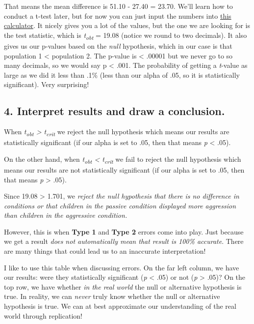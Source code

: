 \documentclass[
]{book}
\begin{document}
That means the mean difference is 51.10 - 27.40 = 23.70. We'll learn how to conduct a t-test later, but for now you can just input the numbers into \href{https://www.usablestats.com/calcs/2samplet\&summary=1}{this calculator}. It nicely gives you a lot of the values, but the one we are looking for is the test statistic, which is \emph{t\textsubscript{obt}} = 19.08 (notice we round to two decimals). It also gives us our p-values based on the \emph{null} hypothesis, which in our case is that population 1 \textless{} population 2. The p-value is \textless{} .00001 but we never go to so many decimals, so we would say p \textless{} .001. The probability of getting a \emph{t}-value as large as we did it less than .1\% (less than our alpha of .05, so it is statistically significant). Very surprising!

\hypertarget{interpret-results-and-draw-a-conclusion.}{%
\subsection{4. Interpret results and draw a conclusion.}\label{interpret-results-and-draw-a-conclusion.}}

When \emph{t\textsubscript{obt} \textgreater{} t\textsubscript{crit}} we reject the null hypothesis which means our results are statistically significant (if our alpha is set to .05, then that means \emph{p} \textless{} .05).

On the other hand, when \emph{t\textsubscript{obt} \textless{} t\textsubscript{crit}} we fail to reject the null hypothesis which means our results are not statistically significant (if our alpha is set to .05, then that means \emph{p} \textgreater{} .05).

Since 19.08 \textgreater{} 1.701, we \emph{reject the null hypothesis that there is no difference in conditions or that children in the passive condition displayed more aggression than children in the aggressive condition.}

However, this is when \textbf{Type 1} and \textbf{Type 2} errors come into play. Just because we get a result \emph{does not automatically mean that result is 100\% accurate}. There are many things that could lead us to an inaccurate interpretation!

I like to use this table when discussing errors. On the far left column, we have our results: were they statistically significant (\emph{p} \textless{} .05) or not (\emph{p} \textgreater{} .05)? On the top row, we have whether \emph{in the real world} the null or alternative hypothesis is true. In reality, we can \emph{never} truly know whether the null or alternative hypothesis is true. We can at best approximate our understanding of the real world through replication!
\end{document}
